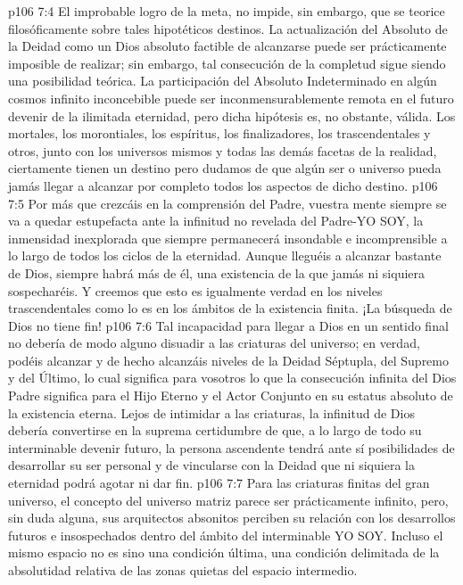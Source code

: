 \vs p106 7:4 El improbable logro de la meta, no impide, sin embargo, que se teorice filosóficamente sobre tales hipotéticos destinos. La actualización del Absoluto de la Deidad como un Dios absoluto factible de alcanzarse puede ser prácticamente imposible de realizar; sin embargo, tal consecución de la completud sigue siendo una posibilidad teórica. La participación del Absoluto Indeterminado en algún cosmos infinito inconcebible puede ser inconmensurablemente remota en el futuro devenir de la ilimitada eternidad, pero dicha hipótesis es, no obstante, válida. Los mortales, los morontiales, los espíritus, los finalizadores, los trascendentales y otros, junto con los universos mismos y todas las demás facetas de la realidad, ciertamente tienen un destino  pero dudamos de que algún ser o universo pueda jamás llegar a alcanzar por completo todos los aspectos de dicho destino.
\vs p106 7:5 \pc Por más que crezcáis en la comprensión del Padre, vuestra mente siempre se va a quedar estupefacta ante la infinitud no revelada del Padre\hyp{}YO SOY, la inmensidad inexplorada que siempre permanecerá insondable e incomprensible a lo largo de todos los ciclos de la eternidad. Aunque lleguéis a alcanzar bastante de Dios, siempre habrá más de él, una existencia de la que jamás ni siquiera sospecharéis. Y creemos que esto es igualmente verdad en los niveles trascendentales como lo es en los ámbitos de la existencia finita. ¡La búsqueda de Dios no tiene fin!
\vs p106 7:6 Tal incapacidad para llegar a Dios en un sentido final no debería de modo alguno disuadir a las criaturas del universo; en verdad, podéis alcanzar y de hecho alcanzáis niveles de la Deidad Séptupla, del Supremo y del Último, lo cual significa para vosotros lo que la consecución infinita del Dios Padre significa para el Hijo Eterno y el Actor Conjunto en su estatus absoluto de la existencia eterna. Lejos de intimidar a las criaturas, la infinitud de Dios debería convertirse en la suprema certidumbre de que, a lo largo de todo su interminable devenir futuro, la persona ascendente tendrá ante sí posibilidades de desarrollar su ser personal y de vincularse con la Deidad que ni siquiera la eternidad podrá agotar ni dar fin.
\vs p106 7:7 \pc Para las criaturas finitas del gran universo, el concepto del universo matriz parece ser prácticamente infinito, pero, sin duda alguna, sus arquitectos absonitos perciben su relación con los desarrollos futuros e insospechados dentro del ámbito del interminable YO SOY. Incluso el mismo espacio no es sino una condición última, una condición delimitada  de la absolutidad relativa de las zonas quietas del espacio intermedio.

